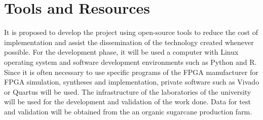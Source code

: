 \documentclass[
    12pt,                       %
    oneside,                    %
    a4paper,                    %
    brazil,                     %
    french,                     %
    spanish,                    %
    english,                    %
    ]{abntex2}
\begin{document}
\section{Tools and Resources}

  It is proposed to develop the project using open-source tools to reduce the cost of implementation and assist the dissemination of the technology created whenever possible. For the development phase, it will be used a computer with Linux operating system and software development environments such as Python and R. Since it is often necessary to use specific programs of the FPGA manufacturer for FPGA simulation, syntheses and implementation, private software such as Vivado or Quartus will be used. The infrastructure of the laboratories of the university will be used for the development and validation of the work done. Data for test and validation will be obtained from the an organic sugarcane production farm.
\end{document}
